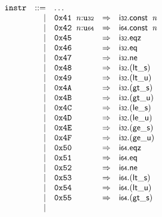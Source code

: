 $$
\begin{array}{@{}l@{}rrlll@{}l@{}}
& {\mathtt{instr}} &::=& \dots \\ &&|&
\mathtt{0x41}~\,{\mathit{n}}{:}{\mathtt{u{\scriptstyle32}}} &\Rightarrow& \mathsf{i{\scriptstyle32}}.\mathsf{const}~\,{\mathit{n}} \\ &&|&
\mathtt{0x42}~\,{\mathit{n}}{:}{\mathtt{u{\scriptstyle64}}} &\Rightarrow& \mathsf{i{\scriptstyle64}}.\mathsf{const}~\,{\mathit{n}} \\ &&|&
\mathtt{0x45} &\Rightarrow& \mathsf{i{\scriptstyle32}} . \mathsf{eqz} \\ &&|&
\mathtt{0x46} &\Rightarrow& \mathsf{i{\scriptstyle32}} . \mathsf{eq} \\ &&|&
\mathtt{0x47} &\Rightarrow& \mathsf{i{\scriptstyle32}} . \mathsf{ne} \\ &&|&
\mathtt{0x48} &\Rightarrow& \mathsf{i{\scriptstyle32}} . ({\mathsf{lt\_}}{\mathsf{s}}) \\ &&|&
\mathtt{0x49} &\Rightarrow& \mathsf{i{\scriptstyle32}} . ({\mathsf{lt\_}}{\mathsf{u}}) \\ &&|&
\mathtt{0x4A} &\Rightarrow& \mathsf{i{\scriptstyle32}} . ({\mathsf{gt\_}}{\mathsf{s}}) \\ &&|&
\mathtt{0x4B} &\Rightarrow& \mathsf{i{\scriptstyle32}} . ({\mathsf{gt\_}}{\mathsf{u}}) \\ &&|&
\mathtt{0x4C} &\Rightarrow& \mathsf{i{\scriptstyle32}} . ({\mathsf{le\_}}{\mathsf{s}}) \\ &&|&
\mathtt{0x4D} &\Rightarrow& \mathsf{i{\scriptstyle32}} . ({\mathsf{le\_}}{\mathsf{u}}) \\ &&|&
\mathtt{0x4E} &\Rightarrow& \mathsf{i{\scriptstyle32}} . ({\mathsf{ge\_}}{\mathsf{s}}) \\ &&|&
\mathtt{0x4F} &\Rightarrow& \mathsf{i{\scriptstyle32}} . ({\mathsf{ge\_}}{\mathsf{u}}) \\ &&|&
\mathtt{0x50} &\Rightarrow& \mathsf{i{\scriptstyle64}} . \mathsf{eqz} \\ &&|&
\mathtt{0x51} &\Rightarrow& \mathsf{i{\scriptstyle64}} . \mathsf{eq} \\ &&|&
\mathtt{0x52} &\Rightarrow& \mathsf{i{\scriptstyle64}} . \mathsf{ne} \\ &&|&
\mathtt{0x53} &\Rightarrow& \mathsf{i{\scriptstyle64}} . ({\mathsf{lt\_}}{\mathsf{s}}) \\ &&|&
\mathtt{0x54} &\Rightarrow& \mathsf{i{\scriptstyle64}} . ({\mathsf{lt\_}}{\mathsf{u}}) \\ &&|&
\mathtt{0x55} &\Rightarrow& \mathsf{i{\scriptstyle64}} . ({\mathsf{gt\_}}{\mathsf{s}}) \\ &&|&

\end{array}$$
